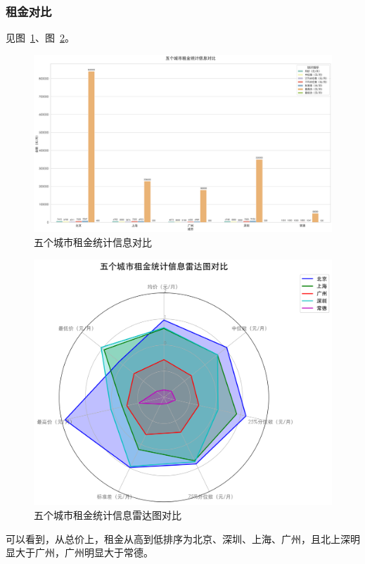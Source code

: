 \subsubsection{租金对比}
见图~\ref{fig:price_bar_chart}、图~\ref{fig:price_radar_chart}。
\begin{figure}[htbp]
    \centering
    \includegraphics[width=0.7\linewidth]{../../figure/price_bar_chart.png}
    \caption{五个城市租金统计信息对比}
    \label{fig:price_bar_chart}
\end{figure}
\begin{figure}[htbp]
    \centering
    \includegraphics[width=0.7\linewidth]{../../figure/price_radar_chart.png}
    \caption{五个城市租金统计信息雷达图对比}
    \label{fig:price_radar_chart}
\end{figure}

可以看到，从总价上，租金从高到低排序为北京、深圳、上海、广州，且北上深明显大于广州，广州明显大于常德。

